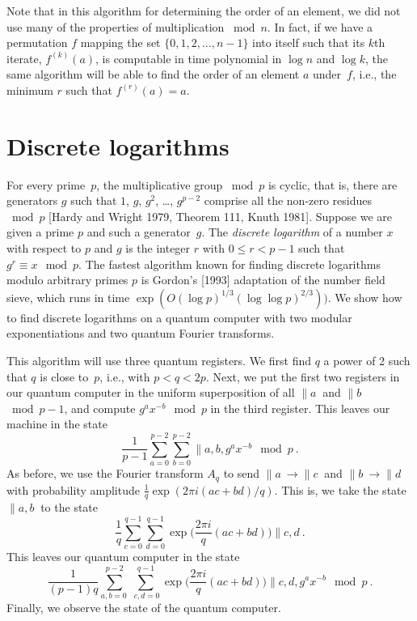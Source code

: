 Note that in this algorithm for determining the order of an
element, we did not use many of the 
properties of multiplication $\bmod{n}$.  In fact, if we have a permutation
$f$ mapping the set $\{0,1,2,\ldots,n-1\}$ into itself such
that its $k$th iterate, $f^{(k)}(a)$, is computable in time polynomial 
in $\log n$ and $\log k$,
the same algorithm will be able to find the order of an element $a$ 
under~$f$, i.e., the minimum $r$ such that $f^{(r)}(a)=a$.

\section{Discrete logarithms}
For every prime~$p$, the multiplicative group $\bmod{p}$ is cyclic,
that is, there are generators $g$ such that $1$, $g$, $g^2$, \ldots, 
$g^{p-2}$
comprise all the non-zero residues $\bmod{p}$ [Hardy and Wright 1979,
Theorem 111, Knuth 1981].  Suppose we are given a prime $p$ and such a 
generator~$g$.  The {\em discrete logarithm} of a number $x$ with
respect to $p$ and $g$ is the integer $r$ with $0 \leq r < p-1$ such that
$g^r \equiv x \mod{p}$.  The fastest algorithm known for finding discrete
logarithms modulo arbitrary primes $p$ is Gordon's [1993] adaptation of 
the number field sieve, which runs in time 
$\exp(O(\log p)^{1/3} (\log \log p)^{2/3}))$.  We show how to find discrete
logarithms on a quantum computer with two 
modular exponentiations and two quantum Fourier transforms.  

This algorithm will use three quantum registers.  We first
find $q$ a power of 2 such that $q$ is close to~$p$, i.e., with
$p < q < 2p$.
Next, we put the first two registers in 
our quantum computer in the uniform superposition of
all $\|a\>$ and $\|b\>$ 
$\bmod{p-1}$, and compute $g^ax^{-b}\mod{p}$ in the third register.  This 
leaves our machine in the state
\begin{equation}
\frac{1}{p-1}\sum_{a=0}^{p-2}\sum_{b=0}^{p-2} \|a,b,g^a x^{-b}\mod{p}\>.
\end{equation}
As before, we use the Fourier transform $A_q$ to
send $\|a\>\rightarrow \|c\>$ and $\|b\>\rightarrow \|d\>$
with probability amplitude $\frac{1}{q}\exp(2\pi i (ac+bd)/q)$.
This is, we take the state $\|a,b\>$ to the state
\begin{equation}
\frac{1}{q} \sum_{c=0}^{q-1} \sum_{d=0}^{q-1} 
\textstyle \exp\big(\frac{2 \pi i}{q} (ac+bd)\big)
\|c,d\>.
\end{equation}
This leaves our quantum computer in the state
\begin{equation}
{\frac{1}{(p-1)q}}
\sum_{a,b=0\ }^{p-2} \sum_{\ c,d=0}^{q-1}
\textstyle \exp\big(\frac{2 \pi i}{q} (ac+bd)\big)
\|c,d,g^a x^{-b}\!\mod{p}\>.
\end{equation}
Finally, we observe the state of the quantum computer.

